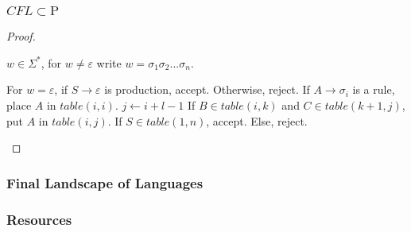 \documentclass[notheorems]{beamer}
\theoremstyle{definition}
\theoremstyle{remark}
\newcommand{\pclass}{\text{P}}
\newcommand{\pathprob}{\text{PATH}}
\newcommand{\relprimeprob}{\text{RELPRIME}}
\newcommand{\cflclass}{\text{CFL}}
\begin{document}
    \begin{frame}
        \frametitle{\(CFL \subset\pclass\)}

        \begin{proof}
            \begin{description} \footnotesize
                \item[Input:] \(w \in \Sigma^*\), for \(w \neq \varepsilon\) write \(w = \sigma_1\sigma_2...\sigma_n\).
                \item[Function:] \phantom{}
                    \begin{algorithmic}[1]
                        \State For \(w = \varepsilon\), if \(S \rightarrow \varepsilon\) is production, accept. Otherwise, reject.
                                \State If \(A \rightarrow \sigma_i\) is a rule, place \(A\) in \(table(i, i)\).
                            \EndFor
                        \EndFor
                         
                             
                                \State \(j \gets i + l - 1\) 
                                 
                                        \State If \(B \in table(i, k)\) and \(C \in table(k + 1, j)\), put \(A\) in \(table(i, j)\).
                                    \EndFor
                                \EndFor
                            \EndFor
                        \EndFor
                        \State If \(S \in table(1, n)\), accept. Else, reject.
                    \end{algorithmic}
            \end{description}
        \end{proof}

    \end{frame}

    \begin{frame}
        \frametitle{Final Landscape of Languages}
        \begin{figure}[!htbp]
        \end{figure}
    \end{frame}

    \begin{frame}
        \frametitle{Resources}
        \nocite{*}
        \renewcommand{\refname}{\normalsize References} 
        
        
    \end{frame}
\end{document}
